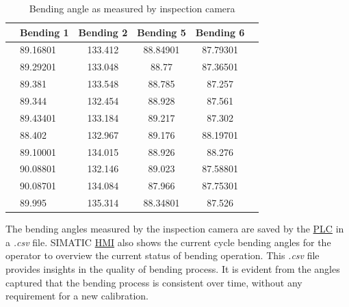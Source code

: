 \begin{table}[ht]
    \centering
    \small
    \renewcommand{\arraystretch}{1.2} %
    \begin{tabular}{llcccc}
        & \textbf{Bending 1} & \textbf{Bending 2} & \textbf{Bending 5} & \textbf{Bending 6} \\
        \hline
        & 89.16801 & 133.412 & 88.84901 & 87.79301 \\
        & 89.29201 & 133.048 & 88.77    & 87.36501 \\
        & 89.381   & 133.548 & 88.785   & 87.257   \\
        & 89.344   & 132.454 & 88.928   & 87.561   \\
        & 89.43401 & 133.184 & 89.217   & 87.302   \\
        & 88.402   & 132.967 & 89.176   & 88.19701 \\
        & 89.10001 & 134.015 & 88.926   & 88.276   \\
        & 90.08801 & 132.146 & 89.023   & 87.58801 \\
        & 90.08701 & 134.084 & 87.966   & 87.75301 \\
        & 89.995   & 135.314 & 88.34801 & 87.526   \\
        \hline
    \end{tabular}
    \caption{Bending angle as measured by inspection camera}
    \label{tab:bending-data}
\end{table}

The bending angles measured by the inspection camera are saved by the \hyperref[acro:PLC]{PLC} in a \textit{.csv} file. SIMATIC \hyperref[acro:HMI]{HMI} also shows the current cycle bending angles for the operator to overview the current status of bending operation. This \textit{.csv} file provides insights in the quality of bending process. It is evident from the angles captured that the bending process is consistent over time, without any requirement for a new calibration.